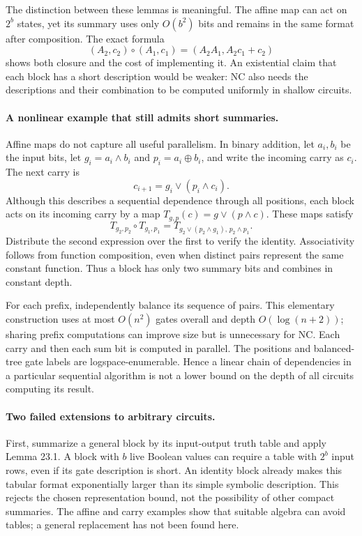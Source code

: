 \documentclass[11pt]{article}
\begin{document}
The distinction between these lemmas is meaningful. The affine map can act
on $2^b$ states, yet its summary uses only $O(b^2)$ bits and remains in the
same format after composition. The exact formula
\[
 (A_2,c_2)\circ(A_1,c_1)
       =(A_2A_1,A_2c_1+c_2)
\]
shows both closure and the cost of implementing it. An existential claim
that each block has a short description would be weaker: NC also needs
the descriptions and their combination to be computed uniformly in shallow
circuits.

\paragraph{A nonlinear example that still admits short summaries.}
Affine maps do not capture all useful parallelism. In binary addition,
let $a_i,b_i$ be the input bits, let $g_i=a_i\wedge b_i$ and
$p_i=a_i\mathbin{\oplus}b_i$, and write the incoming carry as $c_i$.
The next carry is
\[
                         c_{i+1}=g_i\vee(p_i\wedge c_i).
\]
Although this describes a sequential dependence through all positions,
each block acts on its incoming carry by a map
$T_{g,p}(c)=g\vee(p\wedge c)$. These maps satisfy
\begin{equation}\label{a23:carry}
 T_{g_2,p_2}\circ T_{g_1,p_1}
  =T_{g_2\vee(p_2\wedge g_1),\,p_2\wedge p_1}.
\end{equation}
Distribute the second expression over the first to verify the identity.
Associativity follows from function composition, even when distinct pairs
represent the same constant function. Thus a block has only two summary bits
and combines in constant depth.

For each prefix, independently balance its sequence of pairs. This elementary
construction uses at most $O(n^2)$ gates overall and depth $O(\log(n+2))$;
sharing prefix computations can improve size but is unnecessary for NC.
Each carry and then each sum bit is computed in parallel. The positions
and balanced-tree gate labels are logspace-enumerable. Hence a linear chain
of dependencies in a particular sequential algorithm is not a lower bound
on the depth of all circuits computing its result.

\paragraph{Two failed extensions to arbitrary circuits.}
First, summarize a general block by its input-output truth table and apply
Lemma 23.1. A block with $b$ live Boolean values can require a table with
$2^b$ input rows, even if its gate description is short. An identity block
already makes this tabular format exponentially larger than its simple
symbolic description. This rejects the chosen representation bound, not the
possibility of other compact summaries. The affine and carry examples show
that suitable algebra can avoid tables; a general replacement has not been
found here.
\end{document}
